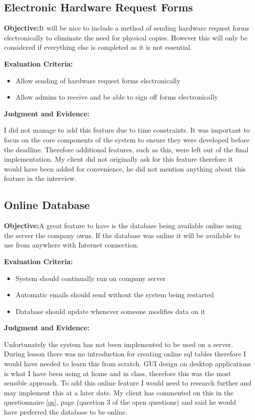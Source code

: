 \subsection{Electronic Hardware Request Forms}

\textbf{Objective:}It will be nice to include a method of sending hardware request forms electronically to eliminate the need for physical copies. However this will only be considered if everything else is completed as it is not essential.

\textbf{Evaluation Criteria:}
\begin{itemize}
\item{Allow sending of hardware request forms electronically}
\item{Allow admins to receive and be able to sign off forms electronically}
\end{itemize}

\textbf{Judgment and Evidence:}

I did not manage to add this feature due to time constraints. It was important to focus on the core components of the system to ensure they were developed before the deadline. Therefore additional features, such as this, were left out of the final implementation. My client did not originally ask for this feature therefore it would have been added for convenience, he did not mention anything about this feature in the interview.

\subsection{Online Database}

\textbf{Objective:}A great feature to have is the database being available online using the server the company owns. If the database was online it will be available to use from anywhere with Internet connection.

\textbf{Evaluation Criteria:}
\begin{itemize}
\item{System should continually run on company server}
\item{Automatic emails should send without the system being restarted}
\item{Database should update whenever someone modifies data on it}
\end{itemize}

\textbf{Judgment and Evidence:}

Unfortunately the system has not been implemented to be used on a server.  During lesson there was no introduction for creating online sql tables therefore I would have needed to learn this from scratch. GUI design on desktop applications is what I have been using at home and in class, therefore this was the most sensible approach. To add this online feature I would need to research further and may implement this at a later date. My client has commented on this in the questionnaire \ref{qs}, page \pageref{qs} (question 3 of the open questions) and said he would have preferred the database to be online.

